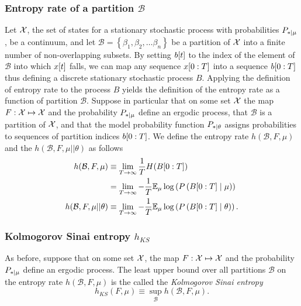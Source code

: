 \subsubsection{Entropy rate of a partition $\mathcal{B}$}
 Let ${\cal X}$, the set of states for a
stationary stochastic process with probabilities $P_{*\mid \mu}$, be a
continuum, and let $\mathcal{B} = \left\{ \beta_1,\beta_2,\ldots
  \beta_n \right\}$ be a partition of ${\cal X}$ into a finite number
of non-overlapping subsets.  By setting ${b}{[t]}$ to the index of
the element of $\mathcal{B}$ into which ${x}{[t]}$ falls, we can map
any sequence $x[0:T]$ into a sequence $b[0:T]$ thus
defining a discrete stationary stochastic process $B$.  Applying the
definition of entropy rate to the process $B$ yields the definition of
the entropy rate as a function of partition $\mathcal{B}$.  Suppose in
particular that on some set ${\cal X}$ the map $F:{\cal X}\mapsto{\cal
  X}$ and the probability $P_{*\mid \mu}$ define an ergodic process, that
$\mathcal{B}$ is a partition of ${\cal X}$, and that the model
probability function $P_{*\mid \theta}$ assigns probabilities to sequences
of partition indices $b[0:T]$.  We define the entropy rate $
h(\mathcal{B},F,\mu)$ and the  %
$h(\mathcal{B},F,\mu||\theta)$ as follows
\begin{align}
  \label{eq:hrate6}
  h(\mathcal{B},F,\mu) &\equiv \lim_{T \rightarrow \infty} \frac{1}{T}
  H(B[0:T]) \\
  &= \lim_{T \rightarrow \infty} -\frac{1}{T} \mathbb{E}_\mu \log\left(P
  \left(B[0:T]\mid  \mu \right) \right) \nonumber\\
  \label{eq:hrate7}
  h(\mathcal{B},F,\mu||\theta) &\equiv \lim_{T \rightarrow \infty}
  -\frac{1}{T} \mathbb{E}_\mu \log\left(P \left(B[0:T] \mid  \theta \right)
  \right). \nonumber  
\end{align}
\subsubsection{Kolmogorov Sinai entropy $h_{KS}$}
%
%
%
As before, suppose that on some set ${\cal X}$, the map $F:{\cal
  X}\mapsto{\cal X}$ and the probability $P_{*\mid \mu}$ define an ergodic
process.  The least upper bound over all partitions $\mathcal{B}$ on
the entropy rate $h(\mathcal{B},F,\mu)$ is the called the
\emph{Kolmogorov Sinai entropy}
\begin{equation}
  \label{eq:hKS}
  h_{KS}(F,\mu) \equiv \sup_{\mathcal{B}} h(\mathcal{B},F,\mu).
\end{equation}

